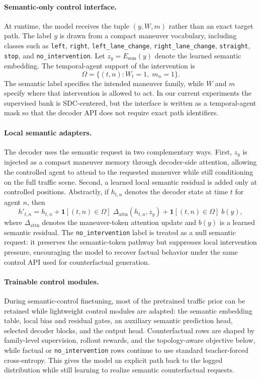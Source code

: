 \documentclass{article}
\begin{document}
\paragraph{Semantic-only control interface.}
At runtime, the model receives the tuple $(y,W,m)$ rather than an exact target path. The label $y$ is drawn from a compact maneuver vocabulary, including classes such as \texttt{left}, \texttt{right}, \texttt{left\_lane\_change}, \texttt{right\_lane\_change}, \texttt{straight}, \texttt{stop}, and \texttt{no\_intervention}. Let $z_y = E_{\mathrm{sem}}(y)$ denote the learned semantic embedding. The temporal-agent support of the intervention is
\[
\Omega = \{(t,n) : W_t = 1,\; m_n = 1\}.
\]
The semantic label specifies the intended maneuver family, while $W$ and $m$ specify where that intervention is allowed to act. In our current experiments the supervised bank is SDC-centered, but the interface is written as a temporal-agent mask so that the decoder API does not require exact path identifiers.

\paragraph{Local semantic adapters.}
The decoder uses the semantic request in two complementary ways. First, $z_y$ is injected as a compact maneuver memory through decoder-side attention, allowing the controlled agent to attend to the requested maneuver while still conditioning on the full traffic scene. Second, a learned local semantic residual is added only at controlled positions. Abstractly, if $h_{t,n}$ denotes the decoder state at time $t$ for agent $n$, then
\[
h'_{t,n}
=
h_{t,n}
+
\mathbf{1}[(t,n)\in\Omega]\;\Delta_{\mathrm{attn}}(h_{t,n},z_y)
+
\mathbf{1}[(t,n)\in\Omega]\;b(y),
\]
where $\Delta_{\mathrm{attn}}$ denotes the maneuver-token attention update and $b(y)$ is a learned semantic residual. The \texttt{no\_intervention} label is treated as a null semantic request: it preserves the semantic-token pathway but suppresses local intervention pressure, encouraging the model to recover factual behavior under the same control API used for counterfactual generation.

\paragraph{Trainable control modules.}
During semantic-control finetuning, most of the pretrained traffic prior can be retained while lightweight control modules are adapted: the semantic embedding table, local bias and residual gates, an auxiliary semantic prediction head, selected decoder blocks, and the output head. Counterfactual rows are shaped by family-level supervision, rollout rewards, and the topology-aware objective below, while factual or \texttt{no\_intervention} rows continue to use standard teacher-forced cross-entropy. This gives the model an explicit path back to the logged distribution while still learning to realize semantic counterfactual requests.
\end{document}
